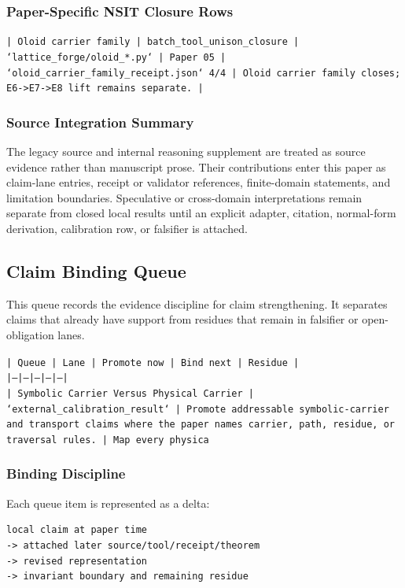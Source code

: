 \documentclass[11pt]{article}
\begin{document}
\subsubsection*{Paper-Specific NSIT Closure Rows}

\noindent\texttt{| Oloid carrier family | batch\_tool\_unison\_closure | `lattice\_forge/oloid\_*.py` | Paper 05 | `oloid\_carrier\_family\_receipt.json` 4/4 | Oloid carrier family closes; E6->E7->E8 lift remains separate. |}\\

\subsubsection*{Source Integration Summary}

The legacy source and internal reasoning supplement are treated as source
evidence rather than manuscript prose. Their contributions enter this paper as
claim-lane entries, receipt or validator references, finite-domain statements,
and limitation boundaries. Speculative or cross-domain interpretations remain
separate from closed local results until an explicit adapter, citation,
normal-form derivation, calibration row, or falsifier is attached.
\subsection*{Claim Binding Queue}

This queue records the evidence discipline for claim strengthening. It separates claims that already have support from residues that remain in falsifier or open-obligation lanes.

\noindent\texttt{| Queue | Lane | Promote now | Bind next | Residue |}\\
\noindent\texttt{|---|---|---|---|---|}\\
\noindent\texttt{| Symbolic Carrier Versus Physical Carrier | `external\_calibration\_result` | Promote addressable symbolic-carrier and transport claims where the paper names carrier, path, residue, or traversal rules. | Map every physica}\\

\subsubsection*{Binding Discipline}

Each queue item is represented as a delta:

\begin{verbatim}
local claim at paper time
-> attached later source/tool/receipt/theorem
-> revised representation
-> invariant boundary and remaining residue
\end{verbatim}
\end{document}
